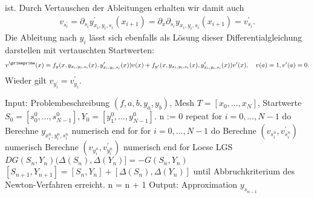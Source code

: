 \begin{solution}
ist. Durch Vertauschen der Ableitungen erhalten wir damit auch
\begin{align*}
  v_{s^{\prime}_i} = \partial_{s_i}y^{\prime}_{x_i,y_i,s_i}(x_{i+1})
  = \partial_x \partial_{s_i}y_{x_i,y_i,s_i}(x_{i+1}) = v_{s_i}^{\prime}.
\end{align*}
Die Ableitung nach $y_i$ lässt sich ebenfalls als Lösung dieser Differentialgleichung
darstellen mit vertauschten Startwerten:
\begin{align*}
  v^{\primeprime}(x) = f_y(x,y_{x_i,y_i,s_i}(x),y_{x_i,y_i,s_i}^{\prime}(x))v(x)
  + f_{y^{\prime}}(x,y_{x_i,y_i,s_i}(x),y_{x_i,y_i,s_i}^{\prime}(x))v^{\prime}(x), \quad v(a) = 1, v^{\prime}(a) = 0.
\end{align*}
Wieder gilt $v_{y^{\prime}_i} = v_{y_i}^{\prime}$.
  \begin{algorithm}[caption={Mehrzielverfahren.}, label={alg1}]
   Input: Problembeschreibung $(f,a,b,y_a,y_b)$, Mesh $T = [x_0,\dots,x_N]$, Startwerte $S_0 = [s_0^0,\dots,s_{N-1}^0], Y_0 = [y_1^0,\dots,y_{N-1}^0]$.
   n := 0
   repeat
      for $i = 0,\dots,N-1$ do
        Berechne $y_{x_i^n,y_i^n,s_i^n}$ numerisch
      end for
      for $i = 0,\dots,N-1$ do
        Berechne $(v_{s_i^n},v_{s_i^n}^{\prime})$ numerisch
        Berechne $(v_{y_i^n},v_{y_i^n}^{\prime})$ numerisch
      end for
      Loese LGS $DG(S_n,Y_n)(\Delta(S_n),\Delta(Y_n)] = -G(S_n,Y_n)$
      $[S_{n+1},Y_{n+1}] = [S_n,Y_n] + [\Delta(S_n),\Delta(Y_n)]$
   until Abbruchkriterium des Newton-Verfahren erreicht.
   n = n + 1
   Output: Approximation $y_{s_{n-1}}$
  \end{algorithm}
\end{solution}

